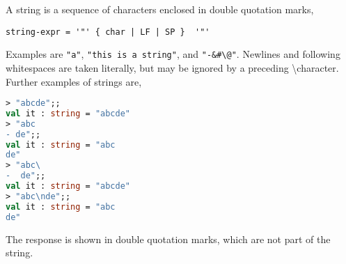 A string is a sequence of characters enclosed in double quotation marks,
%
 \begin{lstlisting}[language=EBNF]
   string-expr = '"' { char | LF | SP }  '"'
\end{lstlisting}
% 
Examples are \lstinline{"a"}, \lstinline{"this is a string"}, and \lstinline{"-&#\@"}. Newlines and following whitespaces are taken literally, but may be ignored by a preceding \textbackslash character. Further examples of strings are,
\begin{lstlisting}[language=fsharp,caption={fsharpi, examples of string literals.}]
> "abcde";;
val it : string = "abcde"
> "abc
- de";;
val it : string = "abc
de"
> "abc\
-  de";;
val it : string = "abcde"
> "abc\nde";;
val it : string = "abc
de"
\end{lstlisting}
%
The response is shown in double quotation marks, which are not part of the string. 

